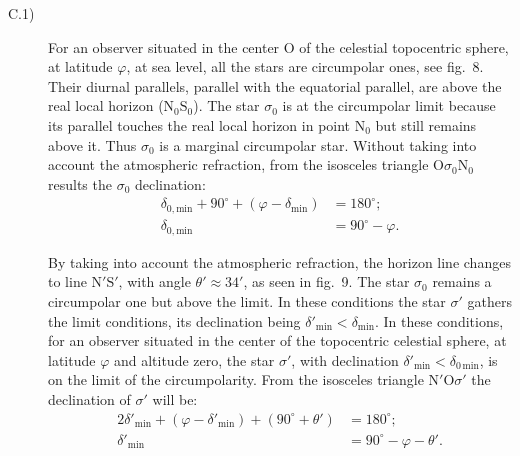 \begin{description}
\item[C.1)] For an observer situated in the center O of the celestial
  topocentric sphere, at latitude $\varphi$, at sea level, all the stars are
  circumpolar ones, see fig.~8. Their diurnal parallels, parallel with the
  equatorial parallel, are above the real local horizon
  ($\mathrm{N}_0\mathrm{S}_0$). The star $\sigma_0$ is at the circumpolar
  limit because its parallel touches the real local horizon in point
  $\mathrm{N}_0$ but still remains above it. Thus $\sigma_0$ is a marginal
  circumpolar star. Without taking into account the atmospheric refraction,
  from the isosceles triangle $\mathrm{O}\sigma_0\mathrm{N}_0$ results the
  $\sigma_0$ declination:
  \begin{align*}
  \delta_{0,\mathrm{min}} + 90^\circ
    + (\varphi - \delta_{\mathrm{min}}) &= 180^\circ;
  \\
  \delta_{0,\mathrm{min}} &= 90^\circ - \varphi.
  \end{align*}

  By taking into account the atmospheric refraction, the horizon line
  changes to line $\mathrm{N}'\mathrm{S}'$, with angle
  $\theta' \approx 34'$, as seen in fig.~9. The star $\sigma_0$ remains a
  circumpolar one but above the limit. In these conditions the star
  $\sigma'$ gathers the limit conditions, its declination being
  $\delta'_{\mathrm{min}} < \delta_{\mathrm{min}}$. In these conditions, for
  an observer situated in the center of the topocentric celestial sphere, at
  latitude $\varphi$ and altitude zero, the star $\sigma'$, with declination
  $\delta'_{\mathrm{min}} < \delta_{0\,\mathrm{min}}$, is on the limit of
  the circumpolarity. From the isosceles triangle
  $\mathrm{N}'\mathrm{O}\sigma'$ the declination of $\sigma'$ will be:
  \begin{align*}
  2\delta'_{\mathrm{min}} + (\varphi - \delta'_{\mathrm{min}})
    + (90^\circ + \theta') &= 180^\circ;\\
  \delta'_{\mathrm{min}} &= 90^\circ - \varphi - \theta'.
  \end{align*}


\end{description}
